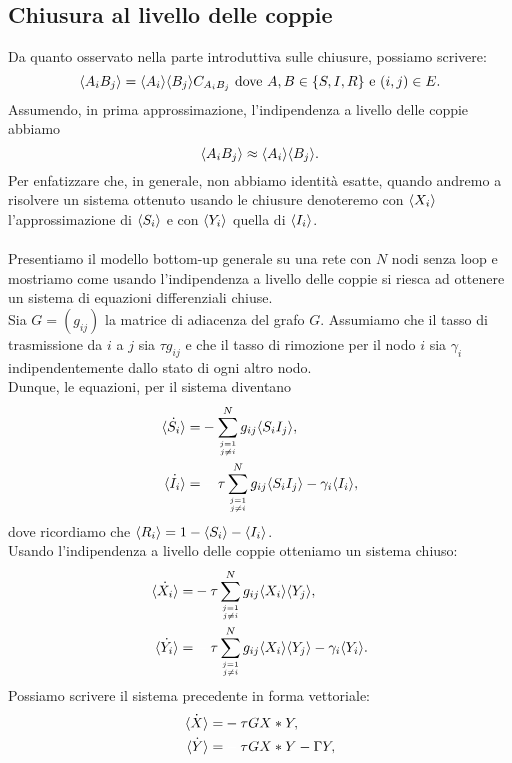 \subsection{Chiusura al livello delle coppie}
Da quanto osservato nella parte introduttiva sulle chiusure, possiamo scrivere:
$$ \langle  A_i B_j \rangle = \langle  A_i \rangle \langle B_j \rangle C_{A_i B_j} \text{ dove } A,B\in \{S,I,R\} \text{ e } (i,j)\in E.$$ 
Assumendo, in prima approssimazione, l'indipendenza a livello delle coppie abbiamo 
$$ \langle  A_i B_j \rangle \approx \langle A_i \rangle\langle B_j \rangle.$$ 
Per enfatizzare che, in generale, non abbiamo identit\`a esatte, quando andremo a risolvere un sistema ottenuto usando le chiusure denoteremo  con $\langle X_i \rangle$ l'approssimazione di $\langle  S_i \rangle$ e con $\langle  Y_i \rangle$ quella di $\langle  I_i \rangle$.\\ \\
Presentiamo il modello bottom-up generale su una rete con $N$ nodi senza loop e mostriamo come usando l'indipendenza a livello delle coppie si riesca ad ottenere un sistema di equazioni differenziali chiuse.\\
Sia $G=(g_{ij})$ la matrice di adiacenza del grafo $G$. Assumiamo che il tasso di trasmissione da $i$ a $j$ sia $\tau g_{ij}$ e che il tasso di rimozione per il nodo $i$ sia $\gamma_i$ indipendentemente dallo stato di ogni altro nodo.\\
Dunque, le equazioni, per il sistema diventano
\begin{equation}
\begin{aligned}
	 \dot{\angol{ S_i}}=& - \sum_{j=1\atop{j\neq i }}^N g_{ij} \angol{ S_i I_j},\\
	 \dot{\angol{I_i}} =&\spa \tau \sum_{j=1\atop{j\neq i}}^N  g_{ij} \angol{ S_i I_j} -\gamma_i \angol{I_i},
\end{aligned}
\end{equation}
dove ricordiamo che $\langle R_i \rangle=1-\langle S_i \rangle- \langle I_i \rangle$.\\
Usando l'indipendenza a livello delle coppie otteniamo  un sistema chiuso: 
\begin{equation}
\begin{aligned}
	 \dot{\angol{ X_i}} =& -\tau \sum_{j=1\atop{j\neq i }}^N g_{ij}\angol{ X_i} \angol{Y_j},\\
	 \dot{\angol{Y_i}} =&\spa \tau \sum_{j=1\atop{j\neq i}}^N  g_{ij}\angol{ X_i}\angol{Y_j} -\gamma_i \angol{Y_i}.
\end{aligned}
\label{Chiuso_coppie}
\end{equation}
Possiamo scrivere il sistema precedente in forma vettoriale:
\begin{equation}
	\begin{aligned}
	\dot{\angol{X}} = & - \tau G X * Y,\\
	\dot{\angol{Y}}=& \spa \tau G X * Y - \Gamma Y,	
	\end{aligned}
\end{equation}

